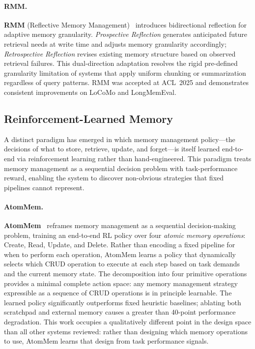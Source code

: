 \paragraph{RMM.}
\textbf{RMM} (Reflective Memory
Management)~\cite{rmm2025} introduces bidirectional reflection for
adaptive memory granularity.  \emph{Prospective Reflection} generates
anticipated future retrieval needs at write time and adjusts memory
granularity accordingly; \emph{Retrospective Reflection} revises
existing memory structure based on observed retrieval failures.  This
dual-direction adaptation resolves the rigid pre-defined granularity
limitation of systems that apply uniform chunking or summarization
regardless of query patterns.  RMM was accepted at ACL~2025 and
demonstrates consistent improvements on LoCoMo and LongMemEval.

\subsection{Reinforcement-Learned Memory}
\label{sec:rl-memory}

A distinct paradigm has emerged in which memory management
policy---the decisions of what to store, retrieve, update, and
forget---is itself learned end-to-end via reinforcement learning rather
than hand-engineered.  This paradigm treats memory management as a
sequential decision problem with task-performance reward, enabling the
system to discover non-obvious strategies that fixed pipelines cannot
represent.

\paragraph{AtomMem.}
\textbf{AtomMem}~\cite{atommem2026} reframes memory management as a
sequential decision-making problem, training an end-to-end RL policy
over four \emph{atomic memory operations}: Create, Read, Update, and
Delete.  Rather than encoding a fixed pipeline for when to perform
each operation, AtomMem learns a policy that dynamically selects which
CRUD operation to execute at each step based on task demands and the
current memory state.  The decomposition into four primitive operations
provides a minimal complete action space: any memory management strategy
expressible as a sequence of CRUD operations is in principle learnable.
The learned policy significantly outperforms fixed heuristic baselines;
ablating both scratchpad and external memory causes a greater than
40-point performance degradation.  This work occupies a qualitatively
different point in the design space than all other systems reviewed:
rather than designing which memory operations to use, AtomMem learns
that design from task performance signals.

